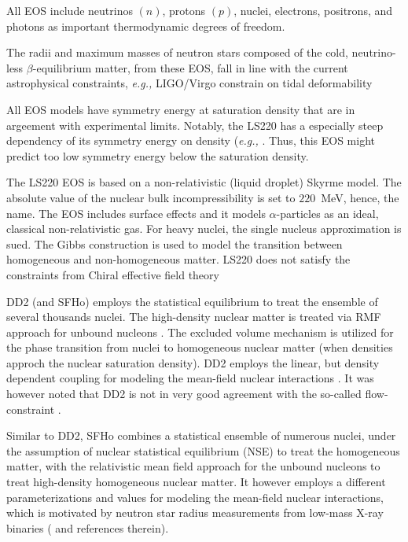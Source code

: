 \documentclass[11pt,a4paper,headinclude=true,DIV=14,BCOR=8mm,chapterprefix,listof=totoc,twoside,openright,abstracton]{scrbook}
\begin{document}
All EOS include neutrinos $(n)$, protons $(p)$, nuclei, electrons, positrons, and photons
as important thermodynamic degrees of freedom.

The radii and maximum masses of neutron stars composed of the cold, neutrino-less $\beta$-equilibrium matter,
from these EOS, fall in line with the current astrophysical constraints, 
\textit{e.g.,} LIGO/Virgo constrain on tidal deformability 
\cite{TheLIGOScientific:2017qsa,Abbott:2018wiz,De:2018uhw,Abbott:2018exr}

All EOS models have symmetry energy at saturation density that are in argeement with experimental limits.
Notably, the LS220 has a especially steep dependency of its symmetry energy on density (\textit{e.g.,} \cite{Lattimer:2012xj,Danielewicz:2013upa}. Thus, this EOS might predict too low symmetry energy below the saturation density. 

The LS220 EOS is based on a non-relativistic (liquid droplet) Skyrme model.
The absolute value of the nuclear bulk incompressibility is set to $220$~MeV, hence, the name.
The EOS includes surface effects and it models $\alpha$-particles as an ideal, classical
non-relativistic gas. For heavy nuclei, the single nucleus approximation is sued. 
The Gibbs construction is used to model the transition between homogeneous and non-homogeneous matter.
LS220 does not satisfy the constraints from Chiral effective field theory \cite{Hempel:2017ikt}

DD2 (and SFHo) employs the statistical equilibrium to treat the ensemble of several thousands nuclei.
The high-density nuclear matter is treated via RMF approach for unbound nucleons \cite{Hempel:2009mc}.
The excluded volume mechanism is utilized for the phase transition from nuclei to homogeneous
nuclear matter (when densities approch the nuclear saturation density).
DD2 employs the linear, but density dependent coupling for modeling the mean-field nuclear interactions \cite{Typel:2009sy}.
It was however noted that DD2 is not in very good agreement with the so-called flow-constraint \cite{Danielewicz:2002pu}.

Similar to DD2, SFHo combines a statistical ensemble of numerous nuclei, under the assumption of nuclear
statistical equilibrium (NSE) to treat the homogeneous matter, 
with the relativistic mean field approach for the unbound nucleons to treat high-density homogeneous nuclear matter.
It however employs a different parameterizations and values for modeling the mean-field nuclear interactions, 
which is motivated by neutron star radius measurements from low-mass X-ray
binaries (\cite{Steiner:2012rk} and references therein).
\end{document}
